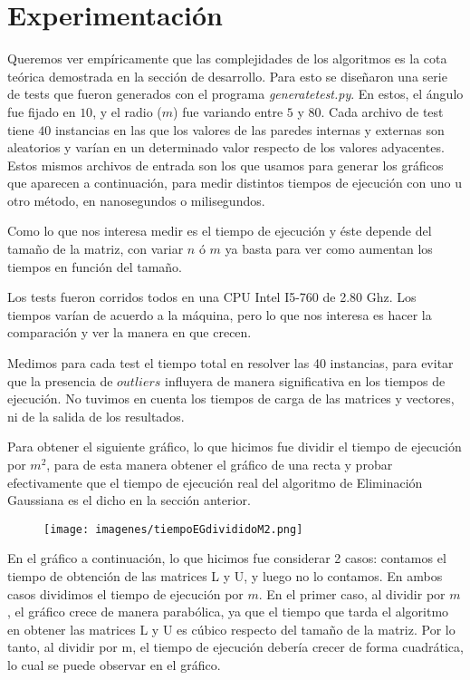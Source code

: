 \section{Experimentación}

Queremos ver empíricamente que las complejidades de los algoritmos es la cota teórica demostrada en la sección de desarrollo. Para esto se diseñaron una serie de tests que fueron generados con el programa \textit{generatetest.py}. En estos, el ángulo fue fijado en $10$, y el radio ($m$) fue variando entre $5$ y $80$.
Cada archivo de test tiene $40$ instancias en las que los valores de las paredes internas y externas son aleatorios y varían en un determinado valor respecto de los valores adyacentes. Estos mismos archivos de entrada son los que usamos para generar los gráficos que aparecen a continuación, para medir distintos tiempos de ejecución con uno u otro método, en nanosegundos o milisegundos.

Como lo que nos interesa medir es el tiempo de ejecución y éste depende del tamaño de la matriz, con variar $n$ ó $m$ ya basta para ver como aumentan los tiempos en función del tamaño.

Los tests fueron corridos todos en una CPU Intel I5-760 de 2.80 Ghz. Los tiempos varían de acuerdo a la máquina, pero lo que nos interesa es hacer la comparación y ver la manera en que crecen.

Medimos para cada test el tiempo total en resolver las 40 instancias, para evitar que la presencia de $outliers$ influyera de manera significativa en los tiempos de ejecución. No tuvimos en cuenta los tiempos de carga de las matrices y vectores, ni de la salida de los resultados.

Para obtener el siguiente gráfico, lo que hicimos fue dividir el tiempo de ejecución por $m^{2}$, para de esta manera obtener el gráfico de una recta y probar efectivamente que el tiempo de ejecución real del algoritmo de Eliminación Gaussiana es el dicho en la sección anterior.

\begin{figure}[h]
  \center
  \texttt{[image: imagenes/tiempoEGdivididoM2.png]}
  \label{fig:egdivididom2}
\end{figure}

En el gráfico a continuación, lo que hicimos fue considerar 2 casos: contamos el tiempo de obtención de las matrices L y U, y luego no lo contamos. En ambos casos dividimos el tiempo de ejecución por $m$. En el primer caso, al dividir por $m$, el gráfico crece de manera parabólica, ya que el tiempo que tarda el algoritmo en obtener las matrices L y U es cúbico respecto del tamaño de la matriz. Por lo tanto, al dividir por m, el tiempo de ejecución debería crecer de forma cuadrática, lo cual se puede observar en el gráfico. 



